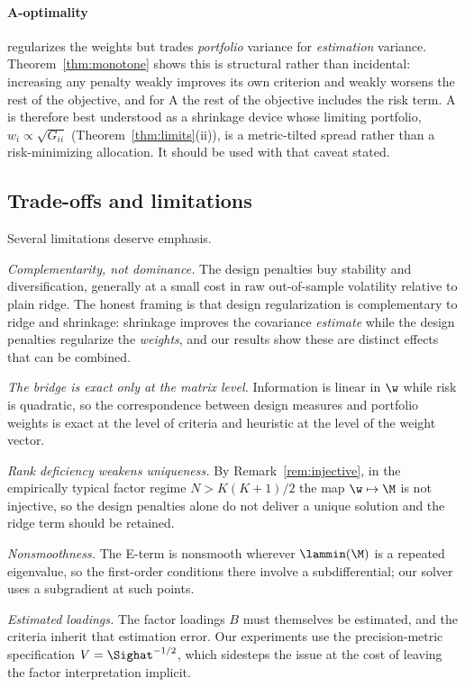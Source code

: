 \paragraph{A-optimality} regularizes the weights but trades \emph{portfolio}
variance for \emph{estimation} variance. Theorem~\ref{thm:monotone} shows this is
structural rather than incidental: increasing any penalty weakly improves its own
criterion and weakly worsens the rest of the objective, and for A the rest of the
objective includes the risk term. A is therefore best understood as a shrinkage
device whose limiting portfolio, $w_i\propto\sqrt{G_{ii}}$
(Theorem~\ref{thm:limits}(ii)), is a metric-tilted spread rather than a
risk-minimizing allocation. It should be used with that caveat stated.

\subsection{Trade-offs and limitations}
Several limitations deserve emphasis.

\emph{Complementarity, not dominance.} The design penalties buy stability and
diversification, generally at a small cost in raw out-of-sample volatility
relative to plain ridge. The honest framing is that design regularization is
complementary to ridge and shrinkage: shrinkage improves the covariance
\emph{estimate} while the design penalties regularize the \emph{weights}, and our
results show these are distinct effects that can be combined.

\emph{The bridge is exact only at the matrix level.} Information is linear in
$\w$ while risk is quadratic, so the correspondence between design measures and
portfolio weights is exact at the level of criteria and heuristic at the level of
the weight vector.

\emph{Rank deficiency weakens uniqueness.} By Remark~\ref{rem:injective}, in the
empirically typical factor regime $N>K(K+1)/2$ the map $\w\mapsto\M$ is not
injective, so the design penalties alone do not deliver a unique solution and the
ridge term should be retained.

\emph{Nonsmoothness.} The E-term is nonsmooth wherever $\lammin(\M)$ is a
repeated eigenvalue, so the first-order conditions there involve a
subdifferential; our solver uses a subgradient at such points.

\emph{Estimated loadings.} The factor loadings $B$ must themselves be estimated,
and the criteria inherit that estimation error. Our experiments use the
precision-metric specification $V=\Sighat^{-1/2}$, which sidesteps the issue at
the cost of leaving the factor interpretation implicit.

